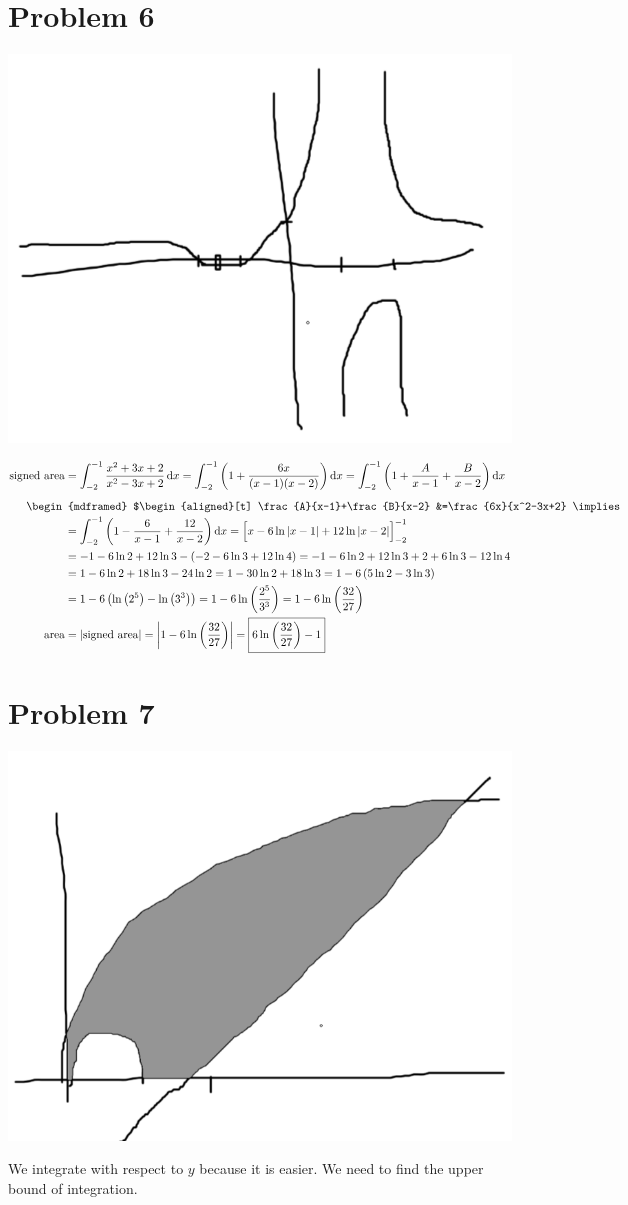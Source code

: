 \documentclass[preview, margin=0.6in]{standalone}
\newcommand{\alignedintertext}[1]{%
  \noalign{%
    \vskip\belowdisplayshortskip
    \vtop{\hsize=\linewidth#1\par
    \expandafter}%
    \expandafter\prevdepth\the\prevdepth
  }%
}
\newcommand*{\problem}[1]{\section*{Problem #1}}
\begin{document}
\problem{6}
\begin{center}
	\includegraphics[width=0.5\linewidth]{q6.png}
\end{center}
$\begin{aligned}[t]
	\text{signed area}
	&=\int_{-2}^{-1}\frac{x^2+3x+2}{x^2-3x+2}\,\mathrm{d}x
	=\int_{-2}^{-1}\left(1+\frac{6x}{(x-1)(x-2)}\right)\mathrm{d}x
	=\int_{-2}^{-1}\left(1+\frac{A}{x-1}+\frac{B}{x-2}\right)\mathrm{d}x \\
	\alignedintertext{
		\begin{mdframed}
			$\begin{aligned}[t]
				\frac{A}{x-1}+\frac{B}{x-2}
				&=\frac{6x}{x^2-3x+2}
				\implies \frac{Ax-2A+Bx-B}{x^2-3x+2}=\frac{6x}{x^2-3x+2}
				=\left\{\begin{aligned}
						A+B&=6 \\
						-2A-B&=0
				\end{aligned}\right. \\
				&\implies -A=6
				\implies A=-6
				\implies B=12
			\end{aligned}$
		\end{mdframed}
	}
	&=\int_{-2}^{-1}\left(1-\frac{6}{x-1}+\frac{12}{x-2}\right)\mathrm{d}x
	=\Big[x-6\ln|x-1|+12\ln|x-2|\Big]_{-2}^{-1} \\
	&=-1-6\ln2+12\ln3-\left(-2-6\ln3+12\ln4\right)
	=-1-6\ln2+12\ln3+2+6\ln3-12\ln4 \\
	&=1-6\ln2+18\ln3-24\ln2
	=1-30\ln2+18\ln3
	=1-6 \left(5\ln2-3\ln 3\right) \\
	&=1-6 \left(\ln \left(2^5\right)-\ln \left(3^3\right)\right)
	=1-6\ln \left(\frac{2^5}{3^3}\right)
	=1-6\ln \left(\frac{32}{27}\right) \\
	\text{area}
	&=\left|\text{signed area}\right|
	=\left|1-6 \ln\left(\frac{32}{27}\right)\right|
	=\boxed{6 \ln\left(\frac{32}{27}\right)-1}
\end{aligned}$

\problem{7}
\begin{center}
	\includegraphics[width=0.5\linewidth]{q7.png}
\end{center}
We integrate with respect to $y$ because it is easier. We need to find the upper bound of integration.
\end{document}
